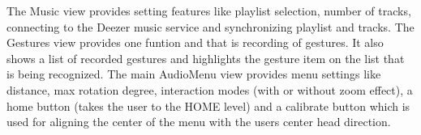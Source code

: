 The Music view provides setting features like playlist selection, number of tracks, connecting to the Deezer music service and synchronizing playlist and tracks. The Gestures view provides one funtion and that is recording of gestures. It also shows a list of recorded gestures and highlights the gesture item on the list that is being recognized. The main AudioMenu view provides menu settings like distance, max rotation degree, interaction modes (with or without zoom effect), a home button (takes the user to the HOME level) and a calibrate button which is used for aligning the center of the menu with the users center head direction.









